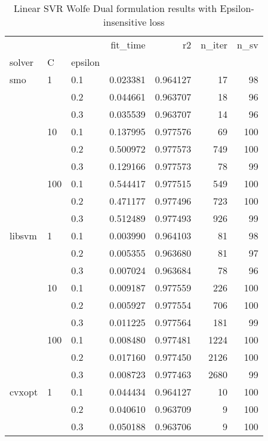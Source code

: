 \begin{table}[H]
\centering
\caption{Linear SVR Wolfe Dual formulation results with Epsilon-insensitive loss}
\label{linear_dual_svr_cv_results}
\begin{tabular}{lllrrrr}
\toprule
       &     &     &  fit\_time &        r2 &  n\_iter &  n\_sv \\
solver & C & epsilon &           &           &         &       \\
\midrule
smo & 1   & 0.1 &  0.023381 &  0.964127 &      17 &    98 \\
       &     & 0.2 &  0.044661 &  0.963707 &      18 &    96 \\
       &     & 0.3 &  0.035539 &  0.963707 &      14 &    96 \\
       & 10  & 0.1 &  0.137995 &  0.977576 &      69 &   100 \\
       &     & 0.2 &  0.500972 &  0.977573 &     749 &   100 \\
       &     & 0.3 &  0.129166 &  0.977573 &      78 &    99 \\
       & 100 & 0.1 &  0.544417 &  0.977515 &     549 &   100 \\
       &     & 0.2 &  0.471177 &  0.977496 &     723 &   100 \\
       &     & 0.3 &  0.512489 &  0.977493 &     926 &    99 \\
libsvm & 1   & 0.1 &  0.003990 &  0.964103 &      81 &    98 \\
       &     & 0.2 &  0.005355 &  0.963680 &      81 &    97 \\
       &     & 0.3 &  0.007024 &  0.963684 &      78 &    96 \\
       & 10  & 0.1 &  0.009187 &  0.977559 &     226 &   100 \\
       &     & 0.2 &  0.005927 &  0.977554 &     706 &   100 \\
       &     & 0.3 &  0.011225 &  0.977564 &     181 &    99 \\
       & 100 & 0.1 &  0.008480 &  0.977481 &    1224 &   100 \\
       &     & 0.2 &  0.017160 &  0.977450 &    2126 &   100 \\
       &     & 0.3 &  0.008723 &  0.977463 &    2680 &    99 \\
cvxopt & 1   & 0.1 &  0.044434 &  0.964127 &      10 &   100 \\
       &     & 0.2 &  0.040610 &  0.963709 &       9 &   100 \\
       &     & 0.3 &  0.050188 &  0.963706 &       9 &   100 \\

\end{tabular}
\end{table}
